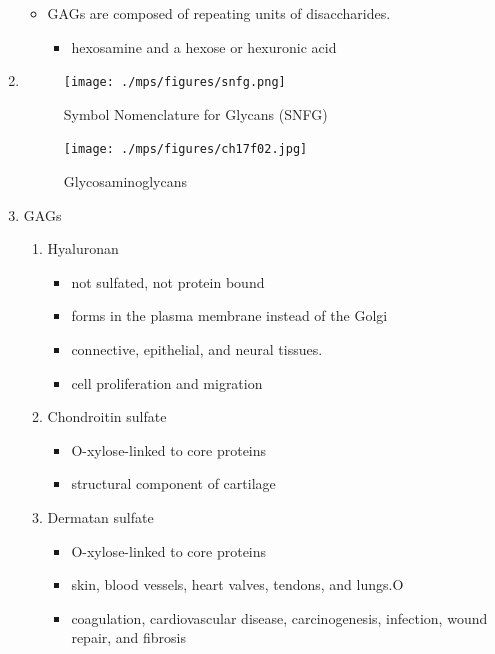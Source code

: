 \documentclass{scrartcl}
\begin{document}
\begin{enumerate}
\begin{itemize}
\item GAGs are composed of repeating units of disaccharides.
\begin{itemize}
\item hexosamine and a hexose or hexuronic acid
\end{itemize}
\end{itemize}

\item 
\label{sec:org257ef3c}

\begin{figure}[htbp]
\centering
\texttt{[image: ./mps/figures/snfg.png]}
\caption[Glycan Nomenclature]{\label{fig:orgf254e9b}
Symbol Nomenclature for Glycans (SNFG)}
\end{figure}


\begin{figure}[htbp]
\centering
\texttt{[image: ./mps/figures/ch17f02.jpg]}
\caption[Glycosaminoglycans]{\label{fig:org331b56c}
Glycosaminoglycans}
\end{figure}

\item GAGs
\label{sec:org37cb81c}

\begin{enumerate}
\item Hyaluronan
\label{sec:org98ffd68}
\begin{itemize}
\item not sulfated, not protein bound
\item forms in the plasma membrane instead of the Golgi
\item connective, epithelial, and neural tissues.
\item cell proliferation and migration
\end{itemize}

\item Chondroitin sulfate
\label{sec:org0dda782}
\begin{itemize}
\item O-xylose-linked to core proteins
\item structural component of cartilage
\end{itemize}

\item Dermatan sulfate
\label{sec:org73217cb}
\begin{itemize}
\item O-xylose-linked to core proteins
\item skin, blood vessels, heart valves, tendons, and lungs.O
\item coagulation, cardiovascular disease, carcinogenesis, infection, wound repair, and fibrosis
\end{itemize}


\end{enumerate}
\end{enumerate}
\end{document}
